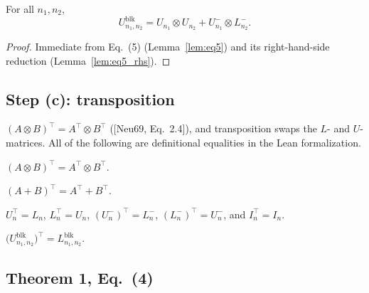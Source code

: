 \begin{theorem}
  \label{thm:theorem1_U}
  \leanok
  For all $n_1, n_2$,
  \[
    U^{\mathrm{blk}}_{n_1,n_2} = U_{n_1} \otimes U_{n_2} + U^-_{n_1} \otimes L^-_{n_2}.
  \]
\end{theorem}
\begin{proof}
  Immediate from Eq.~(5) (Lemma~\ref{lem:eq5}) and its right-hand-side
  reduction (Lemma~\ref{lem:eq5_rhs}).
\end{proof}

\subsection{Step (c): transposition}

$(A \otimes B)^\top = A^\top \otimes B^\top$ ([Neu69, Eq.~2.4]), and
transposition swaps the $L$- and $U$-matrices. All of the following are
definitional equalities in the Lean formalization.

\begin{lemma}
  \label{lem:transpose_kron}
  \leanok
  $(A \otimes B)^\top = A^\top \otimes B^\top$.
\end{lemma}

\begin{lemma}
  \label{lem:transpose_add}
  \leanok
  $(A + B)^\top = A^\top + B^\top$.
\end{lemma}

\begin{lemma}
  \label{lem:transpose_triangular}
  \leanok
  $U_n^\top = L_n$, $L_n^\top = U_n$, $(U^-_n)^\top = L^-_n$,
  $(L^-_n)^\top = U^-_n$, and $I_n^\top = I_n$.
\end{lemma}

\begin{lemma}
  \label{lem:transpose_Ublock}
  \leanok
  $\big(U^{\mathrm{blk}}_{n_1,n_2}\big)^\top = L^{\mathrm{blk}}_{n_1,n_2}$.
\end{lemma}

\subsection{Theorem 1, Eq.~(4)}

